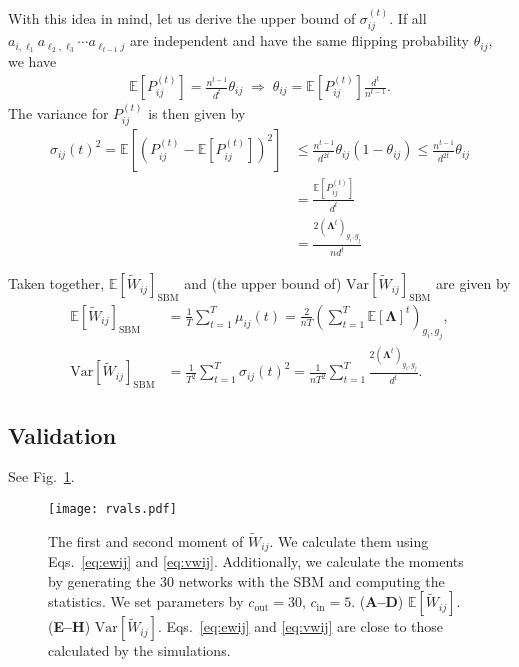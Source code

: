 \documentclass[12pt]{article} %
\def\mat#1{\mathbf{#1}}
\def\Exp{{\mathbb E}}
\def\Var{\text{Var}}
\begin{document}
With this idea in mind, let us derive the upper bound of $\sigma_{ij} ^{(t)}$.
If all $a_{i,\ell_1}a_{\ell_2,\ell_3} \cdots a_{\ell_{t-1}j}$ are independent and have the same flipping probability $\theta_{ij}$, we have
\begin{align}
    \Exp\left[ P_{ij}^{(t)} \right] = \frac{n^{t-1}}{d^t}\theta_{ij} \;
    \Rightarrow\; \theta_{ij}  = \Exp\left[ P_{ij}^{(t)} \right] \frac{d^t}{n^{t-1}}.
\end{align}
The variance for $P_{ij}^{(t)}$ is then given by
\begin{align}
    \label{eq:variance_2}
    \sigma_{ij}(t)^2 = \Exp\left[ \left( P_{ij}^{(t)} - \Exp\left[ P_{ij}^{(t)} \right] \right)^2 \right]
        & \leq \frac{n^{t-1}}{d^{2t}}\theta_{ij}(1-\theta_{ij})
        \leq \frac{n^{t-1}}{d^{2t}}\theta_{ij} \\
        & = \frac{\Exp\left[ P_{ij}^{(t)} \right]}{d^t} \\
        & = \frac{ 2\left(\mat{\Lambda} ^t \right)_{g_i, g_j}}{n d^t}
\end{align}

Taken together, $\Exp[\tilde W_{ij}]_{\text{SBM}}$ and (the upper bound of) $\Var[\tilde W_{ij}]_{\text{SBM}}$ are given by
\begin{align}
    \Exp\left[ \tilde W_{ij} \right]_{\text{SBM}} & = \frac{1}{T} \sum_{t=1}^T \mu_{ij}(t)
             = \frac{2}{nT} \left( \sum_{t=1}^T \Exp\left[ \mat{\Lambda}\right]^t\right)_{g_i, g_j}, \label{eq:ewij} \\
    \Var\left[\tilde W_{ij}\right]_{\text{SBM}} & = \frac{1}{T^2} \sum_{t=1}^T \sigma_{ij}(t)^2
             = \frac{1}{nT^2} \sum_{t=1}^T \frac{ 2\left(\mat{\Lambda} ^t \right)_{g_i, g_j}}{d^t}.  \label{eq:vwij}
\end{align}

\subsection{Validation}
See Fig.~\ref{fig:validation}.
\begin{figure}
    \centering
    \texttt{[image: rvals.pdf]}
    \caption{
        The first and second moment of $\tilde W_{ij}$.
        We calculate them using Eqs.~\eqref{eq:ewij} and \eqref{eq:vwij}.
        Additionally, we calculate the moments by
        generating the 30 networks with the SBM and computing the statistics.
        We set parameters by $c_{\text{out}} = 30$, $c_{\text{in}} = 5$.
        ({\bf A--D}) $\Exp[\tilde W_{ij}]$.
        ({\bf E--H}) $\Var[\tilde W_{ij}]$.
        Eqs.~\eqref{eq:ewij} and \eqref{eq:vwij} are close to those calculated by the simulations.
    }
    \label{fig:validation}
\end{figure}
\end{document}
